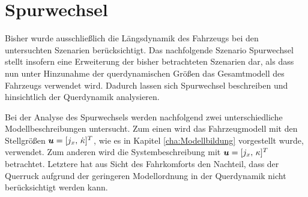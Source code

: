 \section{Spurwechsel}\label{sec:Spurwechsel}
Bisher wurde ausschließlich die Längsdynamik des Fahrzeugs bei den untersuchten Szenarien berücksichtigt. Das nachfolgende Szenario Spurwechsel stellt insofern eine Erweiterung der bisher betrachteten Szenarien dar, als dass nun unter Hinzunahme der querdynamischen Größen das Gesamtmodell des Fahrzeugs verwendet wird. Dadurch lassen sich Spurwechsel beschreiben und hinsichtlich der Querdynamik analysieren. 

Bei der Analyse des Spurwechsels werden nachfolgend zwei unterschiedliche Modellbeschreibungen untersucht. Zum einen wird das Fahrzeugmodell mit den Stellgrößen $\boldsymbol{u} = [j_x,\,\dot{\kappa}]^T$, wie es in Kapitel \ref{cha:Modellbildung} vorgestellt wurde, verwendet. Zum anderen wird die Systembeschreibung mit $\boldsymbol{u} = [j_x,\,\kappa]^T$ betrachtet. Letztere hat aus Sicht des Fahrkomforts den Nachteil, dass der Querruck aufgrund der geringeren Modellordnung in der Querdynamik nicht berücksichtigt werden kann. 

